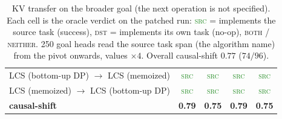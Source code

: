 \begin{table}[h!]
\begin{tabular}{lcccc}
LCS (bottom-up DP) $\to$ LCS (memoized) & \textcolor{ForestGreen}{\textsc{src}} & \textcolor{ForestGreen}{\textsc{src}} & \textcolor{ForestGreen}{\textsc{src}} & \textcolor{ForestGreen}{\textsc{src}} \\
LCS (memoized) $\to$ LCS (bottom-up DP) & \textcolor{ForestGreen}{\textsc{src}} & \textcolor{ForestGreen}{\textsc{src}} & \textcolor{ForestGreen}{\textsc{src}} & \textcolor{ForestGreen}{\textsc{src}} \\
\midrule
\textbf{causal-shift} & \textbf{0.79} & \textbf{0.75} & \textbf{0.79} & \textbf{0.75} \\
\bottomrule
\end{tabular}
\caption{\small KV transfer on the broader goal (the next operation is not specified). Each cell is the oracle verdict on the patched run: \textcolor{ForestGreen}{\textsc{src}} = implements the source task (success), \textsc{dst} = implements its own task (no-op), \textsc{both} / \textsc{neither}. 250 goal heads read the source task span (the algorithm name) from the pivot onwards, values $\times 4$. Overall causal-shift $0.77$ ($74/96$).}
\label{tab:kv-goal}
\end{table}
